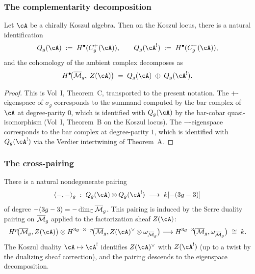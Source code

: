 \subsubsection{The complementarity decomposition}

\begin{theorem}[Complementarity]
Let $\cA$ be a chirally Koszul algebra.
Then on the Koszul locus, there is a natural identification
\[
Q_g(\cA) \;:=\; H^\bullet(C_g^+(\cA)),
\qquad
Q_g(\cA^!) \;:=\; H^\bullet(C_g^-(\cA)),
\]
and the cohomology of the ambient complex decomposes as
\begin{equation}%
H^\bullet\!\bigl(\Mbar_g,\; Z(\cA)\bigr)
\;=\;
Q_g(\cA) \;\oplus\; Q_g(\cA^!).
\end{equation}
\end{theorem}

\begin{proof}
This is Vol~I, Theorem~C, transported to the present notation.
The $+$-eigenspace of $\sigma_g$ corresponds to the summand
computed by the bar complex of $\cA$ at degree-parity $0$,
which is identified with $Q_g(\cA)$ by the bar-cobar
quasi-isomorphism (Vol~I, Theorem~B on the Koszul locus).
The $-$-eigenspace corresponds to the bar complex at
degree-parity $1$, which is identified with $Q_g(\cA^!)$
via the Verdier intertwining of Theorem~A.
\end{proof}

\subsubsection{The cross-pairing}

\begin{theorem}
\label{thm:tholog-cross-pairing}
There is a natural nondegenerate pairing
\begin{equation}%
\langle -,- \rangle_g
\;:\;
Q_g(\cA) \otimes Q_g(\cA^!)
\;\longrightarrow\;
k[-(3g-3)]
\end{equation}
of degree $-(3g-3) = -\dim_{\mathbb{C}}\overline{\mathcal{M}}_g$.
This pairing is induced by the Serre duality pairing on
$\overline{\mathcal{M}}_g$ applied to the factorization sheaf $Z(\cA)$:
\[
H^p\!\bigl(\Mbar_g, Z(\cA)\bigr)
\otimes
H^{3g-3-p}\!\bigl(\Mbar_g, Z(\cA)^\vee \otimes \omega_{\Mbar_g}\bigr)
\longrightarrow
H^{3g-3}\!\bigl(\Mbar_g, \omega_{\Mbar_g}\bigr)
\;\cong\; k.
\]
The Koszul duality $\cA \mapsto \cA^!$ identifies
$Z(\cA)^\vee$ with $Z(\cA^!)$ (up to a twist by the dualizing
sheaf correction), and the pairing descends to the
eigenspace decomposition.
\end{theorem}

